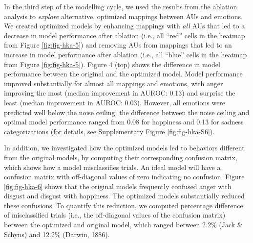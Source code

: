 \documentclass[11pt,american,a4paper,oneside,]{memoir} %
\begin{document}
In the third step of the modelling cycle, we used the results from the ablation analysis to \emph{explore} alternative, optimized mappings between AUs and emotions. We created optimized models by enhancing mappings with \emph{all} AUs that led to a decrease in model performance after ablation (i.e., all ``red'' cells in the heatmap from Figure \ref{fig:fig-hka-5}) and removing AUs from mappings that led to an increase in model performance after ablation (i.e., all ``blue'' cells in the heatmap from Figure \ref{fig:fig-hka-5}). Figure 4 (top) shows the difference in model performance between the original and the optimized model. Model performance improved substantially for almost all mappings and emotions, with anger improving the most (median improvement in AUROC: 0.13) and surprise the least (median improvement in AUROC: 0.03). However, all emotions were predicted well below the noise ceiling: the difference between the noise ceiling and optimal model performance ranged from 0.08 for happiness and 0.13 for sadness categorizations (for details, see Supplementary Figure \ref{fig:fig-hka-S6}).

In addition, we investigated how the optimized models led to behaviors different from the original models, by computing their corresponding confusion matrix, which shows how a model misclassifies trials. An ideal model will have a confusion matrix with off-diagonal values of zero indicating no confusion. Figure \ref{fig:fig-hka-6} shows that the original models frequently confused anger with disgust and disgust with happiness. The optimized models substantially reduced these confusions. To quantify this reduction, we computed percentage difference of misclassified trials (i.e., the off-diagonal values of the confusion matrix) between the optimized and original model, which ranged between 2.2\% (Jack \& Schyns) and 12.2\% (Darwin, 1886).
\end{document}
